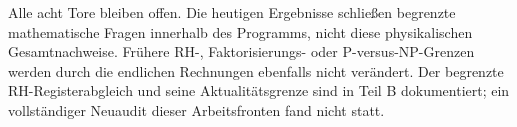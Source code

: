 Alle acht Tore bleiben offen. Die heutigen Ergebnisse schließen
begrenzte mathematische Fragen innerhalb des Programms, nicht diese
physikalischen Gesamtnachweise. Frühere RH-, Faktorisierungs- oder
P-versus-NP-Grenzen werden durch die endlichen Rechnungen ebenfalls
nicht verändert. Der begrenzte RH-Registerabgleich und seine
Aktualitätsgrenze sind in Teil B dokumentiert; ein vollständiger
Neuaudit dieser Arbeitsfronten fand nicht statt.

